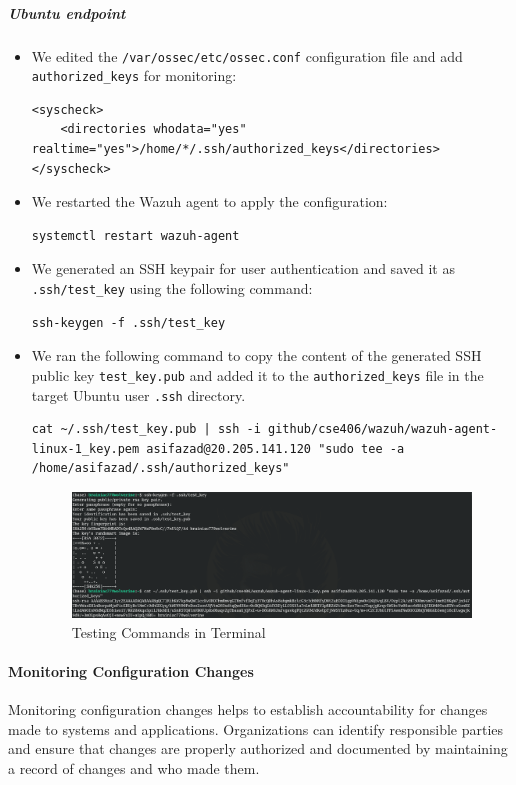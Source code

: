 \subparagraph{Ubuntu endpoint}
\begin{itemize}
    \item We edited the \texttt{/var/ossec/etc/ossec.conf} configuration file and add \texttt{authorized\_keys} for monitoring:
    \begin{verbatim}
<syscheck>
    <directories whodata="yes" realtime="yes">/home/*/.ssh/authorized_keys</directories>
</syscheck>
    \end{verbatim}

    \item  We restarted the Wazuh agent to apply the configuration:
          \begin{verbatim}
systemctl restart wazuh-agent
            \end{verbatim}
    \item We generated an SSH key\-pair for user authentication and saved it as \texttt{.ssh/test\_key} using the following command:
          \begin{verbatim}
ssh-keygen -f .ssh/test_key
            \end{verbatim}
    \item We ran the following command to copy the content of the generated SSH public key \texttt{test\_key.pub} and added it to the \texttt{authorized\_keys} file in the target Ubuntu user \texttt{.ssh} directory.
          \begin{verbatim}
cat ~/.ssh/test_key.pub | ssh -i github/cse406/wazuh/wazuh-agent-linux-1_key.pem asifazad@20.205.141.120 "sudo tee -a /home/asifazad/.ssh/authorized_keys"
            \end{verbatim}
          \begin{figure} [H]
              \centering
              \includegraphics[width=\textwidth]{images/fim/fim-2.png}
              \caption{Testing Commands in Terminal}
              \label{fig:fim-2}
          \end{figure}

\end{itemize}


\paragraph{Monitoring Configuration Changes}
Monitoring configuration changes helps to establish accountability for changes made to systems and applications. Organizations can identify responsible parties and ensure that changes are properly authorized and documented by maintaining a record of changes and who made them.

